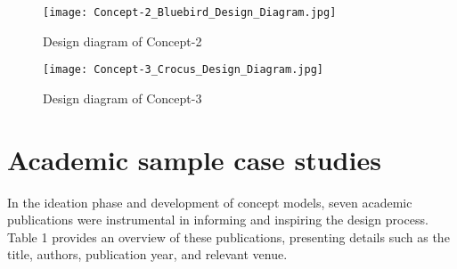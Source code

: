 \begin{appendices}
\begin{figure}[H]
    \centering
    \texttt{[image: Concept-2\_Bluebird\_Design\_Diagram.jpg]}
    \caption{Design diagram of Concept-2}
    \label{fig:timeline}
\end{figure}

\begin{figure}[H]
    \centering
    \texttt{[image: Concept-3\_Crocus\_Design\_Diagram.jpg]}
    \caption{Design diagram of Concept-3}
    \label{fig:timeline}
\end{figure}

\section{Academic sample case studies}
\label{appendix:academic}

In the ideation phase and development of concept models, seven academic publications were instrumental in informing and inspiring the design process. Table 1 provides an overview of these publications, presenting details such as the title, authors, publication year, and relevant venue.


\end{appendices}
